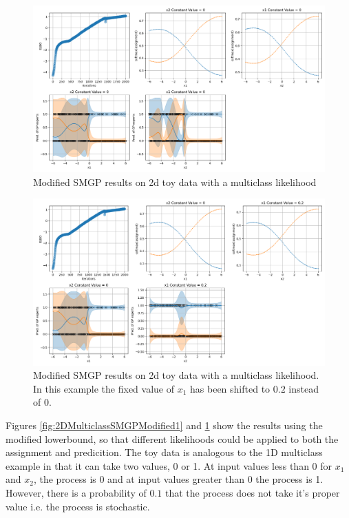 \documentclass[12pt,a4paper]{report}
\theoremstyle{definition}
\begin{document}
\begin{figure}[H]
    \centering
    \includegraphics[width=\linewidth]{demo_tf2_2d_modified_multiclass_2.png}
    \caption{Modified SMGP results on 2d toy data with a multiclass likelihood}
    \label{fig:2DMulticlassSMGPModified2}
\end{figure}

\begin{figure}[H]
    \centering
    \includegraphics[width=\linewidth]{demo_tf2_2d_modified_multiclass_demonstrative.png}
    \caption{Modified SMGP results on 2d toy data with a multiclass likelihood. In this example the fixed value of $x_{1}$ has been shifted to $0.2$ instead of $0$.}
    \label{fig:2DMulticlassSMGPModifiedDemonstrative}
\end{figure}

Figures \ref{fig:2DMulticlassSMGPModified1} and \ref{fig:2DMulticlassSMGPModified2} show the results using the modified lowerbound, so that different likelihoods could be applied to both the assignment and predicition.
The toy data is analogous to the 1D multiclass example in that it can take two values, 0 or 1.
At input values less than 0 for $x_{1}$ and $x_{2}$, the process is 0 and at input values greater than 0 the process is 1.
However, there is a probability of $0.1$ that the process does not take it's proper value i.e. the process is stochastic.
\end{document}
